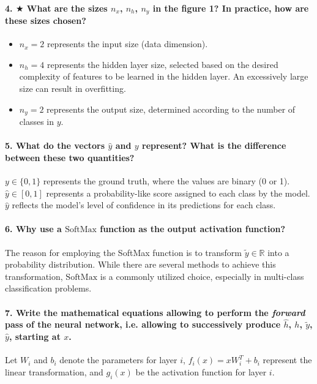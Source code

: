 \documentclass{article}
\theoremstyle{plain}%
\theoremstyle{definition}
\theoremstyle{remark}
\begin{document}
\paragraph{4. $\bigstar$ What are the sizes $n_x$, $n_h$, $n_y$ in the figure 1? In practice, how are these sizes chosen?}
\begin{itemize}
    \item $n_x = 2$ represents the input size (data dimension).
    \item $n_h = 4$ represents the hidden layer size, selected based on the desired complexity of features to be learned in the hidden layer. An excessively large size can result in overfitting.
    \item $n_y = 2$ represents the output size, determined according to the number of classes in $y$.
\end{itemize}

\paragraph{5. What do the vectors $\hat{y}$ and $y$ represent? What is the difference between these two quantities?}
$y \in \{0,1\}$ represents the ground truth, where the values are binary (0 or 1).
$\hat{y} \in [0,1]$ represents a probability-like score assigned to each class by the model. $\hat{y}$ reflects the model's level of confidence in its predictions for each class.

\paragraph{6. Why use a $\text{SoftMax}$ function as the output activation function?}
The reason for employing the SoftMax function is to transform $\tilde{y} \in \mathbb{R}$ into a probability distribution. While there are several methods to achieve this transformation, $\text{SoftMax}$ is a commonly utilized choice, especially in multi-class classification problems.

\paragraph{7. Write the mathematical equations allowing to perform the \textit{forward} pass of the neural network, i.e. allowing to successively produce $\hat{h}$, $ h $, $ \tilde{y} $, $ \hat{y} $, starting at $x$.}
Let $W_i$ and $b_i$ denote the parameters for layer $i$, $f_i(x) = x W_i ^T + b_i$ represent the linear transformation, and $g_i(x)$ be the activation function for layer $i$.
\end{document}
